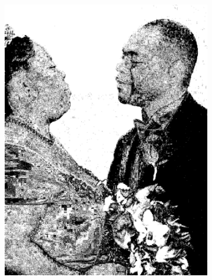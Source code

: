 \begin{figure}[h]
{\begin{subfigure}[b]{0.23\textwidth}
         \includegraphics[width=\textwidth]{images/results/cross_st/mike_med_dark_bayes.png}
     \end{subfigure}}
     

\end{figure}

